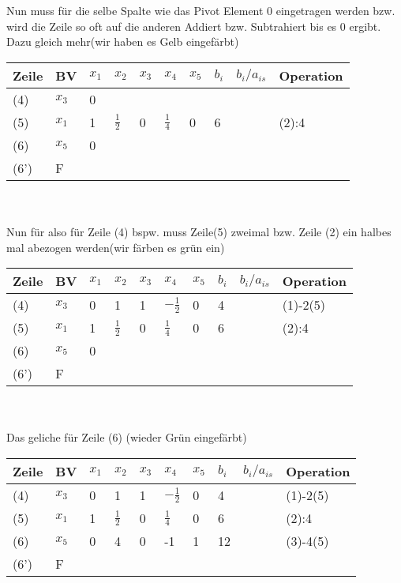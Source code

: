 \documentclass{article}
\begin{document}
Nun muss für die selbe Spalte wie das Pivot Element 0 eingetragen werden bzw. wird die Zeile so oft auf die anderen Addiert bzw. Subtrahiert bis es 0 ergibt. Dazu gleich mehr(wir haben es Gelb eingefärbt)\\
\begin{tabular}{|l|l|l|l|l|l|l|l|l|l|}
	\hline
	Zeile & BV &$x_{1}$&$x_{2}$&$x_{3}$&$x_{4}$&$x_{5}$&$b_{i}$&$b_{i}/a_{is}$&Operation\\
	\hline
	(4)&$x_{3}$&\cellcolor{yellow}0&&&&&&&\\
	\hline
	(5)&$x_{1}$&1&$\frac{1}{2}$&0&$\frac{1}{4}$&0&6&&(2):4\\
	\hline
	(6)&$x_{5}$&\cellcolor{yellow}0&&&&&&&\\
	\hline
	(6')&F&&&&&&&&\\
	\hline
\end{tabular}\\\\
Nun für also für Zeile (4) bspw. muss Zeile(5) zweimal bzw. Zeile (2) ein halbes mal abezogen werden(wir färben es grün ein)\\
\begin{tabular}{|l|l|l|l|l|l|l|l|l|l|}
	\hline
	Zeile & BV &$x_{1}$&$x_{2}$&$x_{3}$&$x_{4}$&$x_{5}$&$b_{i}$&$b_{i}/a_{is}$&Operation\\
	\hline
	(4)&$x_{3}$&\cellcolor{green}0&\cellcolor{green}1&\cellcolor{green}1&\cellcolor{green}$-\frac{1}{2}$&\cellcolor{green}0&\cellcolor{green}4&&(1)-2(5)\\
	\hline
	(5)&$x_{1}$&1&$\frac{1}{2}$&0&$\frac{1}{4}$&0&6&&(2):4\\
	\hline
	(6)&$x_{5}$&0&&&&&&&\\
	\hline
	(6')&F&&&&&&&&\\
	\hline
\end{tabular}\\\\
Das geliche für Zeile (6) (wieder Grün eingefärbt)\\
\begin{tabular}{|l|l|l|l|l|l|l|l|l|l|}
	\hline
	Zeile & BV &$x_{1}$&$x_{2}$&$x_{3}$&$x_{4}$&$x_{5}$&$b_{i}$&$b_{i}/a_{is}$&Operation\\
	\hline
	(4)&$x_{3}$&0&1&1&$-\frac{1}{2}$&0&4&&(1)-2(5)\\
	\hline
	(5)&$x_{1}$&1&$\frac{1}{2}$&0&$\frac{1}{4}$&0&6&&(2):4\\
	\hline
	(6)&$x_{5}$&\cellcolor{green}0&\cellcolor{green}4&\cellcolor{green}0&\cellcolor{green}-1&\cellcolor{green}1&\cellcolor{green}12&&(3)-4(5)\\
	\hline
	(6')&F&&&&&&&&\\
	\hline
\end{tabular}\\\\
\end{document}
